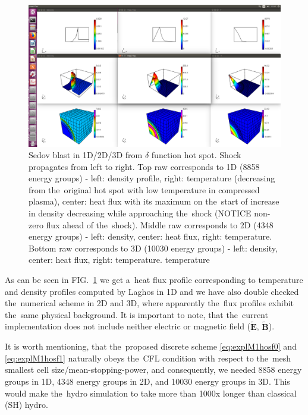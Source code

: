 \documentclass[review]{elsarticle}
\newcommand{\vect}[1]{\boldsymbol{#1}}
\newcommand{\tE}{\vect{\tilde{E}}}
\newcommand{\tB}{\vect{\tilde{B}}}
\newcommand{\figref}[1]{FIG.~\ref{#1}}
\begin{document}
\begin{figure}[tbh]
  \begin{center}
      \includegraphics[width=1.0\textwidth]{M1Sedov1D2D3D.png}
  \caption{
  Sedov blast in 1D/2D/3D from $\delta$ function hot spot. 
  Shock propagates from left to right. Top raw corresponds to 1D 
  (8858 energy groups) - 
  left: density profile, right: temperature 
  (decreasing from the~original hot spot with low temperature in compressed 
  plasma), center: heat flux with its maximum on the~start of increase 
  in density decreasing while approaching the~shock 
  (NOTICE non-zero flux ahead of the~shock). 
  Middle raw corresponds to 2D (4348 energy groups) - 
  left: density, center: heat flux, right: temperature.
  Bottom raw corresponds to 3D (10030 energy groups) - 
  left: density, center: heat flux, right: temperature.
  temperature 
  }
  \end{center}
  \label{fig:expl1D2D3D}
\end{figure}

As can be seen in \figref{fig:expl1D2D3D} we get a~heat flux profile 
corresponding to temperature and density profiles computed by Laghos 
\cite{Dobrev_Kolev_Rieben-High-order_curvilinear_finite_element_methods_for_Lagrangian_hydrodynamics}
in 1D and we have also double checked the~numerical scheme in 2D and 3D, where
apparently the~flux profiles exhibit the~same physical background.
It is important to note, that the~current implementation does not include
neither electric or magnetic field ($\tE$, $\tB$).

It is worth mentioning, that the~proposed discrete scheme 
\eqref{eq:explM1hosf0} and \eqref{eq:explM1hosf1} naturally obeys the~CFL
condition with respect to the~mesh smallest cell size/mean-stopping-power, and
consequently, we needed 8858 energy groups in 1D, 4348 energy groups in 2D, and
10030 energy groups in 3D. This would make the~hydro simulation to take 
more than 1000x longer than classical (SH) hydro.
\end{document}
